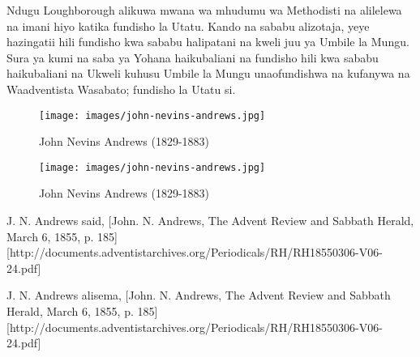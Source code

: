Ndugu Loughborough alikuwa mwana wa mhudumu wa Methodisti na alilelewa na imani hiyo katika fundisho la Utatu. Kando na sababu alizotaja, yeye hazingatii hili fundisho kwa sababu halipatani na kweli juu ya Umbile la Mungu. Sura ya kumi na saba ya Yohana haikubaliani na fundisho hili kwa sababu haikubaliani na Ukweli kuhusu Umbile la Mungu unaofundishwa na kufanywa na Waadventista Wasabato; fundisho la Utatu si.


\begin{figure}[hp]
    \centering
    \texttt{[image: images/john-nevins-andrews.jpg]}
    \caption*{John Nevins Andrews (1829-1883)}
    \label{fig:j-n-andrews}
\end{figure}


\begin{figure}[hp]
    \centering
    \texttt{[image: images/john-nevins-andrews.jpg]}
    \caption*{John Nevins Andrews (1829-1883)}
    \label{fig:j-n-andrews}
\end{figure}


J. N. Andrews said, [John. N. Andrews, The Advent Review and Sabbath Herald, March 6, 1855, p. 185][http://documents.adventistarchives.org/Periodicals/RH/RH18550306-V06-24.pdf]


J. N. Andrews alisema, [John. N. Andrews, The Advent Review and Sabbath Herald, March 6, 1855, p. 185][http://documents.adventistarchives.org/Periodicals/RH/RH18550306-V06-24.pdf]


